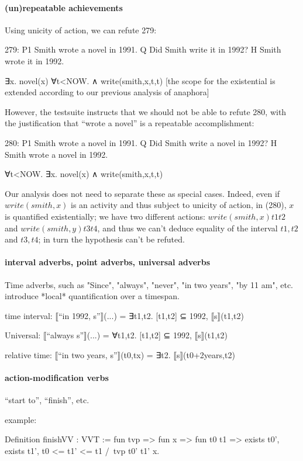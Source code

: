 \documentclass[a4paper,11pt]{article}
\begin{document}
\paragraph{(un)repeatable achievements}
Using unicity of action, we can refute 279:

279:
P1	Smith wrote a novel in 1991.
Q 	Did Smith write it in 1992?
H 	Smith wrote it in 1992.

∃x. novel(x)
∀t<NOW.  ∧ write(smith,x,t,t) [the scope for the existential is extended according to our previous analysis of anaphora]

However, the testsuite instructs that we should not be able to refute
280, with the justification that ``wrote a novel'' is a repeatable
accomplishment:

280:
P1	Smith wrote a novel in 1991.
Q 	Did Smith write a novel in 1992?
H 	Smith wrote a novel in 1992.

∀t<NOW. ∃x. novel(x) ∧ write(smith,x,t,t)

Our analysis does not need to separate these as special cases. Indeed,
even if $write(smith,x)$ is an activity and thus subject to unicity of
action, in (280), $x$ is quantified existentially; we have two
different actions: $write(smith,x) t1 t2$ and $write(smith,y) t3 t4$,
and thus we can't deduce equality of the interval $t1,t2$ and $t3,t4$;
in turn the hypothesis can't be refuted.

\paragraph{interval adverbs, point adverbs, universal adverbs}
Time adverbs, such as "Since", "always", "never", "in two years", "by
11 am", etc. introduce *local* quantification over a timespan.

time interval:
⟦``in 1992, s''⟧(...) = ∃t1,t2.  [t1,t2] ⊆ 1992, ⟦s⟧(t1,t2)

Universal:
⟦``always s''⟧(...) = ∀t1,t2.  [t1,t2] ⊆ 1992, ⟦s⟧(t1,t2)

relative time:
⟦``in two years, s''⟧(t0,tx) = ∃t2.  ⟦s⟧(t0+2years,t2)

\paragraph{action-modification verbs}

``start to'', ``finish'', etc.

example:

Definition finishVV : VVT := fun tvp => fun x => fun t0 t1 =>
exists t0', exists t1', t0 <= t1' <= t1 /\ tvp t0' t1' x.
\end{document}

